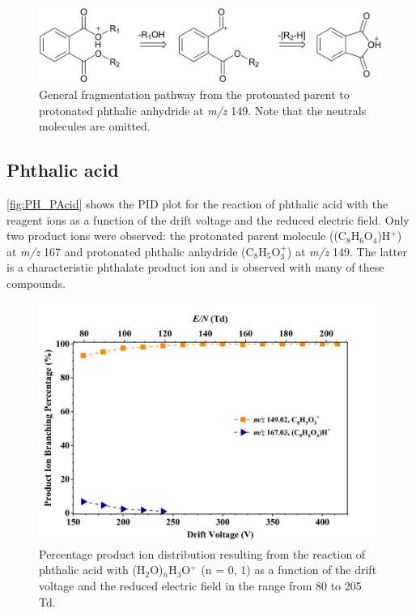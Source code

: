 \begin{figure}[htb]%
\centering
\includegraphics[height=0.1\textheight]{pics/PH/frag.png}
\caption{General fragmentation pathway from the protonated parent to  protonated phthalic anhydride at \textit{m/z} 149. Note that the neutrals molecules are omitted.}
\label{fig:PH_fr}
\end{figure}





\subsection{Phthalic acid}

\autoref{fig:PH_PAcid} shows the PID plot for the reaction of phthalic acid with the reagent ions as a function of the drift voltage and the reduced electric field. 
%
Only two product ions were observed: the protonated parent molecule  ((C$_8$H$_6$O$_4$)H$^+$)  at \textit{m/z} 167 and  protonated phthalic anhydride (C$_8$H$_{5}$O$_3^+$) at \textit{m/z} 149.
%
The latter is a characteristic phthalate product ion and is observed with many of these compounds.

    \begin{figure}[htb]
    \centering
    \includegraphics[height=0.4\textheight]{pics/Pacid-BR.png}
    \caption{Percentage product ion distribution resulting from the reaction of phthalic acid with (H$_2$O)$_n$H$_3$O$^+$ (n = 0, 1) as a function of the drift voltage and the reduced electric field in the range from 80 to 205 Td.}
    \label{fig:PH_PAcid}
    \end{figure}


